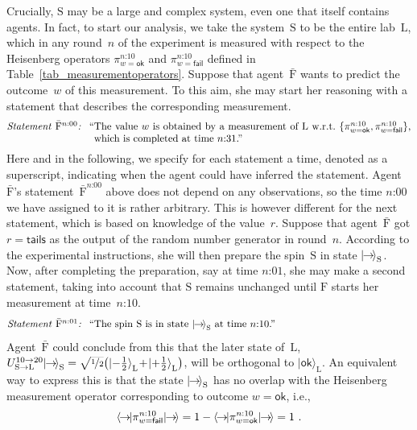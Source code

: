 \documentclass{article}
\theoremstyle{mystyle}
\theoremstyle{definition}
\newcommand*{\ket}[1]{{| #1 \rangle}}
\newcommand*{\bra}[1]{{\langle #1 |}}
\newcommand*{\Friendone}{\mathrm{\bar{F}}}
\newcommand*{\Friendtwo}{\mathrm{F}}
\newcommand*{\Labtwo}{\mathrm{L}}
\newcommand*{\System}{\mathrm{S}}
\newcommand*{\Spin}{\mathrm{S}}
\newcommand*{\spinright}{\ket{{\hspace{-0.2ex}\rightarrow\hspace{-0.4ex}}}}
\newcommand*{\spinrightb}{\bra{{\hspace{-0.3ex}\rightarrow\hspace{-0.3ex}}}}
\newcommand*{\sminus}{{\textstyle - \frac{1}{2}}}
\newcommand*{\splus}{{\textstyle + \frac{1}{2}}}
\newcommand*{\ok}{\mathsf{ok}}
\newcommand*{\fail}{\mathsf{fail}}
\newcommand*{\tail}{\mathsf{tails}}
\newcommand*{\asn}[1]{``#1''}
\newcommand*{\sT}[1]{{\text{\emph{Statement} $#1$\emph{:} }}}
\newcommand*{\sTM}[1]{\begin{minipage}{14cm} \hangindent=8.6em  #1 \end{minipage}}
\begin{document}
Crucially, $\System$ may be a large and complex system,  even one that itself contains agents. In fact, to start our analysis, we take the system~$\System$ to be  the  entire lab~$\Labtwo$, which in any round~$n$ of the experiment is measured  with respect to the  Heisenberg operators  $\pi^{\text{$n$:10}}_{w=\ok}$ and $\pi^{\text{$n$:10}}_{w=\fail}$ defined in Table~\ref{tab_measurementoperators}.  Suppose that agent~$\Friendone$ wants to predict the outcome~$w$ of this measurement. To this aim, she may start her reasoning with a statement that describes the corresponding measurement. 
\begin{align*}
  \sTM{\sT{\Friendone^{\text{$n$:00}}} \asn{The value $w$ is obtained by a measurement of $\Labtwo$  w.r.t.\ $\{\pi^{\text{$n$:10}}_{w=\ok},  \pi^{\text{$n$:10}}_{w=\fail}\}$, which is completed at time $\text{$n$:31}$.}}
\end{align*}
Here and in the following, we specify for each statement a time, denoted as a superscript, indicating when the agent could have inferred the statement.  Agent $\Friendone$'s statement~$\Friendone^{\text{$n$:00}}$ above does not depend on any observations, so the time $\text{$n$:00}$ we have assigned to it is rather arbitrary.  This is however different for the next statement, which is based on knowledge of the value~$r$.  Suppose that agent~$\Friendone$ got $r=\tail$ as the output of the random number generator in round~$n$. According to the experimental instructions, she will then prepare the spin~$\Spin$ in state $\spinright_{\Spin}$. Now, after completing the preparation, say at time $\text{$n$:01}$, she may make a second statement, taking into account that $\Spin$ remains unchanged until $\Friendtwo$ starts her measurement at time~$\text{$n$:10}$.
\begin{align*}
  \sTM{\sT{{\Friendone}^{\text{$n$:01}}}  \asn{The spin $\System$ is in state~$\spinright_{\Spin}$ at time $\text{$n$:10}$.}} 
\end{align*}
Agent~$\Friendone$ could conclude from this that the   later state of~$\Labtwo$, $U_{\Spin \to \Labtwo}^{\text{10} \to \text{20}}  \spinright_{\Spin} =\smash{\sqrt{\nicefrac{1}{2}} \bigl(\ket{\sminus}_{\Labtwo} \! + \!  \ket{\splus}_{\Labtwo}\bigr)}$,  will be orthogonal to $\ket{\ok}_{\Labtwo}$. An equivalent way to express this is that the state $\spinright_{\Spin}$ has no overlap with the  Heisenberg measurement operator corresponding to outcome $w=\ok$, i.e., 
 \begin{align}
\spinrightb \pi_{w=\fail}^{\text{$n$:10}} \spinright 
= 1 - \spinrightb \pi^{\text{$n$:10}}_{w=\ok} \spinright 
= 1 \ . \label{eq_Foneargument}
\end{align}
\end{document}
